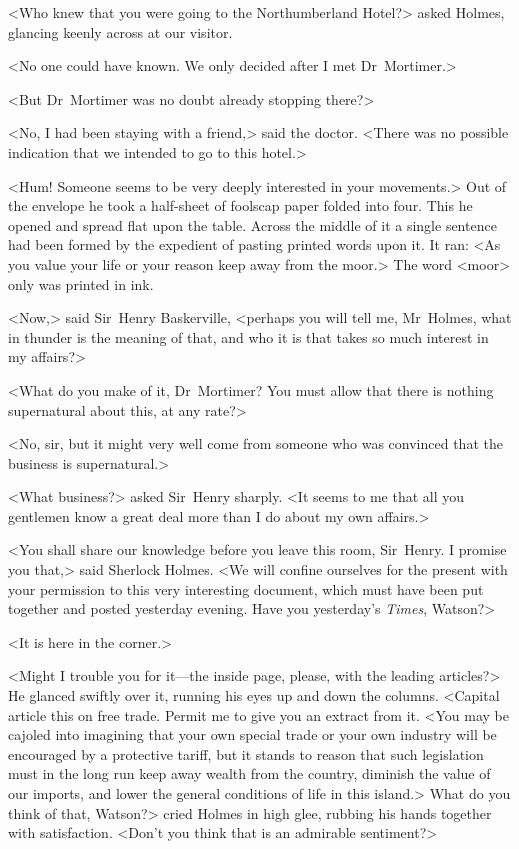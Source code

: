 <Who knew that you were going to the Northumberland Hotel?> asked Holmes, glancing keenly across at our visitor.

<No one could have known. We only decided after I met Dr~Mortimer.>

<But Dr~Mortimer was no doubt already stopping there?>

<No, I had been staying with a friend,> said the doctor. <There was no possible indication that we intended to go to this hotel.>

<Hum! Someone seems to be very deeply interested in your movements.> Out of the envelope he took a half-sheet of foolscap paper folded into four. This he opened and spread flat upon the table. Across the middle of it a single sentence had been formed by the expedient of pasting printed words upon it. It ran: <As you value your life or your reason keep away from the moor.> The word <moor> only was printed in ink.

<Now,> said Sir~Henry Baskerville, <perhaps you will tell me, Mr~Holmes, what in thunder is the meaning of that, and who it is that takes so much interest in my affairs?>

<What do you make of it, Dr~Mortimer? You must allow that there is nothing supernatural about this, at any rate?>

<No, sir, but it might very well come from someone who was convinced that the business is supernatural.>

<What business?> asked Sir~Henry sharply. <It seems to me that all you gentlemen know a great deal more than I do about my own affairs.>

<You shall share our knowledge before you leave this room, Sir~Henry. I promise you that,> said Sherlock Holmes. <We will confine ourselves for the present with your permission to this very interesting document, which must have been put together and posted yesterday evening. Have you yesterday's \textit{Times}, Watson?>

<It is here in the corner.>

<Might I trouble you for it—the inside page, please, with the leading articles?>  He glanced swiftly over it, running his eyes up and down the columns. <Capital article this on free trade. Permit me to give you an extract from it. <You may be cajoled into imagining that your own special trade or your own industry will be encouraged by a protective tariff, but it stands to reason that such legislation must in the long run keep away wealth from the country, diminish the value of our imports, and lower the general conditions of life in this island.> What do you think of that, Watson?> cried Holmes in high glee, rubbing his hands together with satisfaction. <Don't you think that is an admirable sentiment?>


